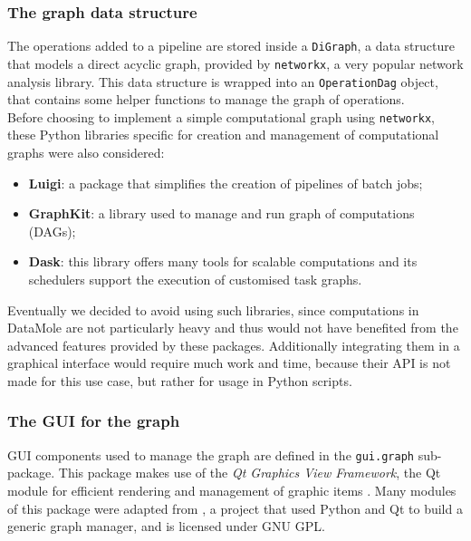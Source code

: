 \subsubsection{The graph data structure}
The operations added to a pipeline are stored inside a \texttt{DiGraph}, a data structure that models a direct acyclic graph, provided by \texttt{networkx}, a very popular network analysis library. This data structure is wrapped into an \texttt{OperationDag} object, that contains some helper functions to manage the graph of operations.\\
Before choosing to implement a simple computational graph using \texttt{networkx}, these Python libraries specific for creation and management of computational graphs were also considered:
\begin{itemize}
	\item \textbf{Luigi}: a package that simplifies the creation of pipelines of batch jobs;
	\item \textbf{GraphKit}: a library used to manage and run graph of computations (DAGs);
	\item \textbf{Dask}: this library offers many tools for scalable computations and its schedulers support the execution of customised task graphs.
\end{itemize}
Eventually we decided to avoid using such libraries, since computations in DataMole are not particularly heavy and thus would not have benefited from the advanced features provided by these packages. Additionally integrating them in a graphical interface would require much work and time, because their API is not made for this use case, but rather for usage in Python scripts.

\subsubsection{The GUI for the graph}
GUI components used to manage the graph are defined in the \texttt{gui.graph} sub-package.
This package makes use of the \textit{Qt Graphics View Framework}, the Qt module for efficient rendering and management of graphic items \cite{site:qt-doc-graphics-view}. Many modules of this package were adapted from \cite{site:nodegraph-pyqt}, a project that used Python and Qt to build a generic graph manager, and is licensed under GNU GPL.

